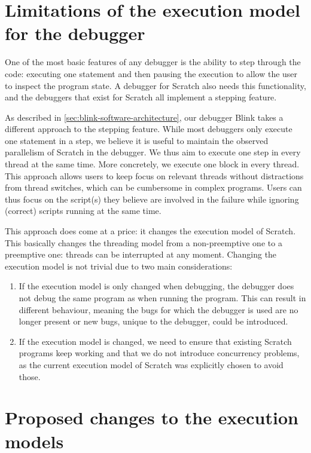 \documentclass[../main]{subfiles}
\begin{document}
\section{Limitations of the execution model for the debugger}\label{sec:limitations-of-the-execution-model-for-the-debugger}

One of the most basic features of any debugger is the ability to step through the code: executing one statement and then pausing the execution to allow the user to inspect the program state.
A debugger for Scratch also needs this functionality, and the debuggers that exist for Scratch all implement a stepping feature.

As described in \cref{sec:blink-software-architecture}, our debugger Blink takes a different approach to the stepping feature.
While most debuggers only execute one statement in a step, we believe it is useful to maintain the observed parallelism of Scratch in the debugger.
We thus aim to execute one step in every thread at the same time.
More concretely, we execute one block in every thread.
This approach allows users to keep focus on relevant threads without distractions from thread switches, which can be cumbersome in complex programs.
Users can thus focus on the script(s) they believe are involved in the failure while ignoring (correct) scripts running at the same time.

This approach does come at a price: it changes the execution model of Scratch.
This basically changes the threading model from a non-preemptive one to a preemptive one: threads can be interrupted at any moment.
Changing the execution model is not trivial due to two main considerations:

\begin{enumerate}
    \item If the execution model is only changed when debugging, the debugger does not debug the same program as when running the program.
        This can result in different behaviour, meaning the bugs for which the debugger is used are no longer present or new bugs, unique to the debugger, could be introduced.
    \item If the execution model is changed, we need to ensure that existing Scratch programs keep working and that we do not introduce concurrency problems, as the current execution model of Scratch was explicitly chosen to avoid those.
\end{enumerate}

\section{Proposed changes to the execution models}\label{sec:a-family-of-new-execution-models}
\end{document}
